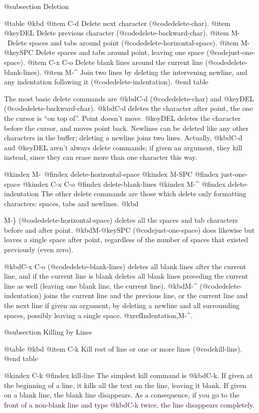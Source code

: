 {{{{{{@subsection Deletion

@table @kbd
@item C-d
Delete next character (@code{delete-char}).
@item @key{DEL}
Delete previous character (@code{delete-backward-char}).
@item M-\
Delete spaces and tabs around point (@code{delete-horizontal-space}).
@item M-@key{SPC}
Delete spaces and tabs around point, leaving one space
(@code{just-one-space}).
@item C-x C-o
Delete blank lines around the current line (@code{delete-blank-lines}).
@item M-^
Join two lines by deleting the intervening newline, and any indentation
following it (@code{delete-indentation}).
@end table

  The most basic delete commands are @kbd{C-d} (@code{delete-char}) and
@key{DEL} (@code{delete-backward-char}).  @kbd{C-d} deletes the character
after point, the one the cursor is ``on top of''.  Point doesn't move.
@key{DEL} deletes the character before the cursor, and moves point back.
Newlines can be deleted like any other characters in the buffer; deleting a
newline joins two lines.  Actually, @kbd{C-d} and @key{DEL} aren't always
delete commands; if given an argument, they kill instead, since they can
erase more than one character this way.

@kindex M-\
@findex delete-horizontal-space
@kindex M-SPC
@findex just-one-space
@kindex C-x C-o
@findex delete-blank-lines
@kindex M-^
@findex delete-indentation
  The other delete commands are those which delete only formatting
characters: spaces, tabs and newlines.  @kbd{M-\} (@code{delete-horizontal-space})
deletes all the spaces and tab characters before and after point.
@kbd{M-@key{SPC}} (@code{just-one-space}) does likewise but leaves a single
space after point, regardless of the number of spaces that existed
previously (even zero).

  @kbd{C-x C-o} (@code{delete-blank-lines}) deletes all blank lines after
the current line, and if the current line is blank deletes all blank lines
preceding the current line as well (leaving one blank line, the current
line).  @kbd{M-^} (@code{delete-indentation}) joins the current line and
the previous line, or the current line and the next line if given an
argument, by deleting a newline and all surrounding spaces, possibly
leaving a single space.  @xref{Indentation,M-^}.

@subsection Killing by Lines

@table @kbd
@item C-k
Kill rest of line or one or more lines (@code{kill-line}).
@end table

@kindex C-k
@findex kill-line
  The simplest kill command is @kbd{C-k}.  If given at the beginning of a
line, it kills all the text on the line, leaving it blank.  If given on a
blank line, the blank line disappears.  As a consequence, if you go to the
front of a non-blank line and type @kbd{C-k} twice, the line disappears
completely.

}}}}}}}
